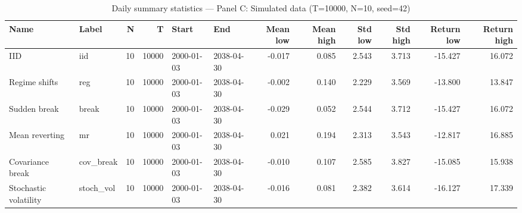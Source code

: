 \begin{table}
\caption{Daily summary statistics --- Panel C: Simulated data (T=10000, N=10, seed=42)}
\label{tab:summary_c}
\begin{tabular}{llrrllrrrrrr}
\toprule
Name & Label & N & T & Start & End & Mean low & Mean high & Std low & Std high & Return low & Return high \\
\midrule
IID & iid & 10 & 10000 & 2000-01-03 & 2038-04-30 & -0.017 & 0.085 & 2.543 & 3.713 & -15.427 & 16.072 \\
Regime shifts & reg & 10 & 10000 & 2000-01-03 & 2038-04-30 & -0.002 & 0.140 & 2.229 & 3.569 & -13.800 & 13.847 \\
Sudden break & break & 10 & 10000 & 2000-01-03 & 2038-04-30 & -0.029 & 0.052 & 2.544 & 3.712 & -15.427 & 16.072 \\
Mean reverting & mr & 10 & 10000 & 2000-01-03 & 2038-04-30 & 0.021 & 0.194 & 2.313 & 3.543 & -12.817 & 16.885 \\
Covariance break & cov_break & 10 & 10000 & 2000-01-03 & 2038-04-30 & -0.010 & 0.107 & 2.585 & 3.827 & -15.085 & 15.938 \\
Stochastic volatility & stoch_vol & 10 & 10000 & 2000-01-03 & 2038-04-30 & -0.016 & 0.081 & 2.382 & 3.614 & -16.127 & 17.339 \\
\bottomrule
\end{tabular}
\end{table}
